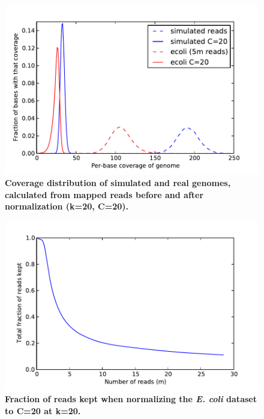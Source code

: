 \documentclass{pnastwo}
\begin{document}
\begin{figure}
\centerline{\includegraphics[width=5in]{diginorm-coverage.pdf}}
\caption{
{\bf Coverage distribution of simulated and real genomes, calculated from mapped reads before and after normalization (k=20, C=20).}}
\label{fig:coverage}
\end{figure}

\begin{figure}
\centerline{\includegraphics[width=5in]{diginorm-accumulation.pdf}}
\caption{
{\bf Fraction of reads kept when normalizing the {\em E. coli} dataset to C=20 at k=20.}}
\label{fig:accumulate}
\end{figure}
\end{document}

